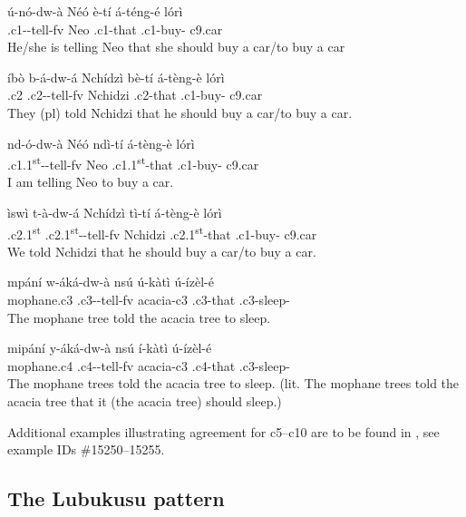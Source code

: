\documentclass[output=paper,
modfonts
]{langscibook}
\begin{document}
\ea \label{1}
\ea \label{1a} \gll ú-nó-dw-à Néó è-tí á-téng-é	lórì\\
.c1--tell-fv Neo .c1-that .c1-buy-	c9.car\\
\glt He/she is telling Neo that she should buy a car\slash to buy a car 

\ex \label{1b} \gll íbò b-á-dw-á Nchídzì	bè-tí á-tèng-è lórì \\
.c2	.c2--tell-fv	Nchidzi	.c2-that .c1-buy- c9.car \\
\glt They (pl) told Nchidzi that he should buy a car\slash to buy a car.

\ex \label{1c} \gll nd-ó-dw-à		 Néó	ndì-tí 		 á-tèng-è		lórì \\
.c1.1\textsuperscript{st}--tell-fv  Neo  .c1.1\textsuperscript{st}-that	 .c1-buy-	c9.car \\
\glt I am telling Neo to buy a car.
  
\ex \label{1d} \gll ìswì   t-à-dw-á   Nchídzì  tì-tí  á-tèng-è	 lórì \\
.c2.1\textsuperscript{st}  .c2.1\textsuperscript{st}--tell-fv   Nchidzi  .c2.1\textsuperscript{st}-that .c1-buy- c9.car\\
\glt We told Nchidzi that he should buy a car\slash to buy a car.

\ex \label{1e} \gll mpání	w-áká-dw-à	nsú	ú-kàtì	ú-ízèl-é \\
mophane.c3	.c3--tell-fv acacia-c3	.c3-that	.c3-sleep-\\
\glt The mophane tree told the acacia tree to sleep.

\ex \label{1f} \gll	mipání		y-áká-dw-à			nsú		í-kàtì		ú-ízèl-é\\
mophane.c4	.c4--tell-fv	acacia-c3	.c4-that	.c3-sleep-\\
\glt The mophane trees told the acacia tree to sleep.  (lit. The mophane trees told the acacia  tree that it (the acacia tree) should sleep.)
\z
\z 

Additional examples illustrating agreement for c5--c10 are to be found in \citet{AfranaphDatabaseOngoing}, see example IDs \#15250--15255.

\subsection{The Lubukusu pattern}
\end{document}

